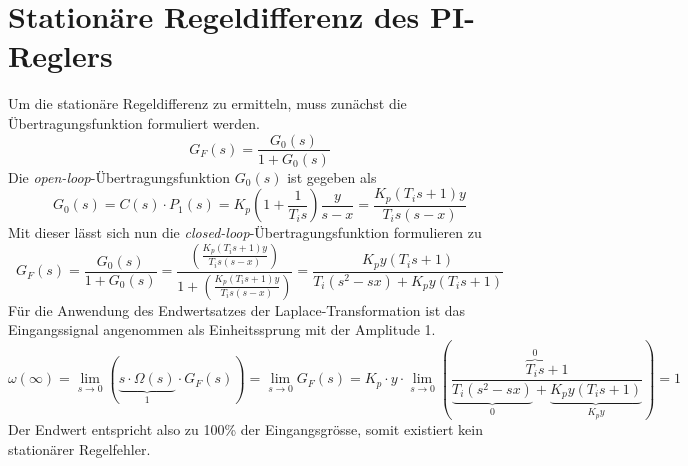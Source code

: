 \section{Stationäre Regeldifferenz des PI-Reglers}
Um die stationäre Regeldifferenz zu ermitteln, muss zunächst die
Übertragungsfunktion formuliert werden.
\[
	G_F(s) = \frac{G_0(s)}{1+G_0(s)}
\]
Die \emph{open-loop}-Übertragungsfunktion $G_0(s)$ ist gegeben als
\[
	G_0(s)
	= C(s) \cdot P_1(s)
	= K_p \left( 1 + \frac{1}{T_i s} \right) \frac{y}{s-x}
	= \frac{K_p(T_i s + 1) y}{T_i s (s-x)}
\]
Mit dieser lässt sich nun die \emph{closed-loop}-Übertragungsfunktion
formulieren zu
\[
	G_F(s)
	= \frac{G_0(s)}{1 + G_0(s)}
	= \frac{
		\left( \frac{K_p(T_i s + 1) y}{T_i s (s-x)} \right)
	}{
		1 + \left( \frac{K_p(T_i s + 1) y}{T_i s (s-x)} \right)
	}
	= \frac{
		K_p y (T_i s + 1)
	}{
		T_i(s^2 - sx) + K_p y (T_i s + 1)
	}
\]
Für die Anwendung des Endwertsatzes der Laplace-Transformation ist das
Eingangssignal angenommen als Einheitssprung mit der Amplitude 1.
\[
	\omega(\infty)
	= \lim_{s \rightarrow 0} \left(
		\underbrace{s \cdot \Omega(s)}_{1} \cdot G_F(s)
	\right)
	= \lim_{s \rightarrow 0} G_F(s)
	= K_p \cdot y \cdot \lim_{s \rightarrow 0} \left(
		\frac{
			\overbrace{T_i s}^{0} + 1
		}{
			\underbrace{T_i(s^2 - sx)}_{0} 
			+ \underbrace{K_p y (T_i s + 1)}_{K_p y}
		}
	\right)
	= 1
\]
Der Endwert entspricht also zu 100\% der Eingangsgrösse, somit existiert
kein stationärer Regelfehler.
